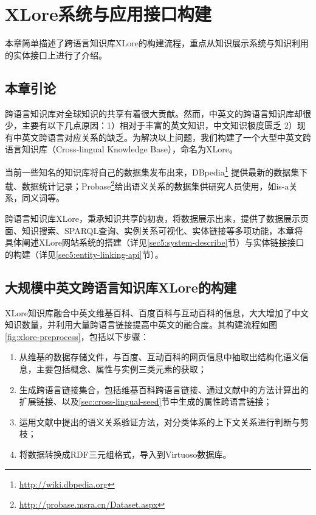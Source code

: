 \chapter{XLore系统与应用接口构建}
\label{cha:xlore}

本章简单描述了跨语言知识库XLore的构建流程，重点从知识展示系统与知识利用的实体接口上进行了介绍。

\section{本章引论}

跨语言知识库对全球知识的共享有着很大贡献。然而，中英文的跨语言知识库却很少，主要有以下几点原因：1）相对于丰富的英文知识，中文知识极度匮乏 2）现有中英文跨语言对应关系的缺乏。为解决以上问题，我们构建了一个大型中英文跨语言知识库（Cross-lingual Knowledge Base），命名为{\heiti XLore}。

当前一些知名的知识库将自己的数据集发布出来，DBpedia\footnote{\url{http://wiki.dbpedia.org}} 提供最新的数据集下载、数据统计记录；Probase\footnote{\url{http://probase.msra.cn/Dataset.aspx}}给出语义关系的数据集供研究人员使用，如is-a关系，同义词等。

跨语言知识库XLore，秉承知识共享的初衷，将数据展示出来，提供了数据展示页面、知识搜索、SPARQL查询、实例关系可视化、实体链接等多项功能，本章将具体阐述XLore网站系统的搭建（详见\ref{sec5:system-describe}节）与实体链接接口的构建（详见\ref{sec5:entity-linking-api}节）。

\section{大规模中英文跨语言知识库XLore的构建}
\label{sec5:cross-lingual-knowledge-base}

XLore知识库融合中英文维基百科、百度百科与互动百科的信息，大大增加了中文知识数量，并利用大量跨语言链接提高中英文的融合度。其构建流程如图\ref{fig:xlore-preprocess}，包括以下步骤：
\begin{enumerate}
\item 从维基的数据存储文件，与百度、互动百科的网页信息中抽取出结构化语义信息，主要包括概念、属性与实例三类元素的获取；
\item 生成跨语言链接集合，包括维基百科跨语言链接、通过文献\cite{wang2012cross}中的方法计算出的扩展链接、以及\ref{sec:cross-lingual-seed}节中生成的属性跨语言链接；
\item 运用文献\cite{wang2014cross}中提出的语义关系验证方法，对分类体系的上下文关系进行判断与剪枝；
\item 将数据转换成RDF三元组格式，导入到Virtuoso数据库。
\end{enumerate}

